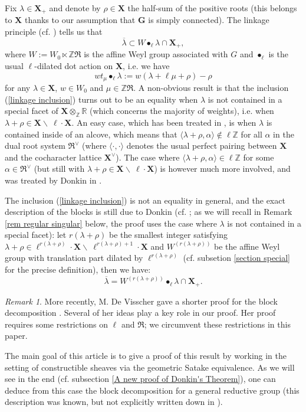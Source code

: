 \documentclass[11pt]{amsart}
\theoremstyle{plain}
\theoremstyle{remark}
\newtheorem{rem}[thm]{Remark}
\numberwithin{equation}{section}
\begin{document}
	Fix $\lambda\in\mathbf{X}_+$ and denote by $\rho\in\mathbf{X}$ the half-sum of the positive roots (this belongs to $\mathbf{X}$ thanks to our assumption that $\mathbf{G}$ is simply connected). The linkage principle (cf. \cite[Corollary 6.17]{jantzen2003representations}) tells us that \begin{equation}\label{linkage inclusion}
	    \overline{\lambda}\subset W\bullet_\ell\lambda\cap\mathbf{X}_+,
	\end{equation} where $W:=W_{0}\ltimes \mathbb{Z}\mathfrak{R}$ is the affine Weyl group associated with $G$ and $\bullet_\ell$ is the usual $\ell$-dilated dot action on $\mathbf{X}$, i.e. we have
	$$wt_\mu\bullet_{\ell}\lambda:=w(\lambda+\ell\mu+\rho)-\rho$$ for any $\lambda\in \mathbf{X}$, $w\in W_{0}$ and $\mu\in \mathbb{Z}\mathfrak{R}$. A non-obvious result is that the inclusion (\ref{linkage inclusion}) turns out to be an equality when $\lambda$ is not contained in a special facet of $\mathbf{X}\otimes_\mathbb{Z}\mathbb{R}$ (which concerns the majority of weights), i.e. when $\lambda+\rho\in\mathbf{X}\backslash~\ell\cdot\mathbf{X}$. An easy case, which has been treated in \cite{humphreys1978blocks}, is when $\lambda$ is contained inside of an alcove, which means that $\langle\lambda+\rho,\alpha\rangle\notin\ell\mathbb{Z}$ for all $\alpha$ in the dual root system $\mathfrak{R}^\vee$ (where $\langle\cdot,\cdot\rangle$ denotes the usual perfect pairing between $\mathbf{X}$ and the cocharacter lattice $\mathbf{X}^\vee$). The case where $\langle\lambda+\rho,\alpha\rangle\in\ell\mathbb{Z}$ for some $\alpha\in \mathfrak{R}^\vee$ (but still with $\lambda+\rho\in\mathbf{X}\backslash~\ell\cdot\mathbf{X}$) is however much more involved, and was treated by Donkin in \cite{donkin1980blocks}.
	
	The inclusion (\ref{linkage inclusion}) is not an equality in general, and the exact description of the blocks is still due to Donkin (cf. \cite{donkin1980blocks}; as we will recall in Remark \ref{rem regular singular} below, the proof uses the case where $\lambda$ is not contained in a special facet): let $r(\lambda+\rho)$ be the smallest integer satisfying $\lambda+\rho\in\ell^{r(\lambda+\rho)}\cdot\mathbf{X}\backslash~\ell^{r(\lambda+\rho)+1}\cdot\mathbf{X}$ and $W^{(r(\lambda+\rho))}$ be the affine Weyl group with translation part dilated by $\ell^{r(\lambda+\rho)}$ (cf. subsetion \ref{section special} for the precise definition), then we have:
	$$\overline{\lambda}=W^{(r(\lambda+\rho))}\bullet_\ell\lambda\cap\mathbf{X}_+ .$$
	\begin{rem}
	More recently, M. De Visscher gave a shorter proof for the block decomposition \cite{article}. Several of her ideas play a key role in our proof. Her proof requires some restrictions on $\ell$ and $\mathfrak{R}$; we circumvent these restrictions in this paper.
	\end{rem}
	The main goal of this article is to give a proof of this result by working in the setting of constructible sheaves via the geometric Satake equivalence. As we will see in the end (cf. subsection \ref{A new proof of Donkin's Theorem}), one can deduce from this case the block decomposition for a general reductive group (this description was known, but not explicitly written down in \cite{donkin1980blocks}).
\end{document}
